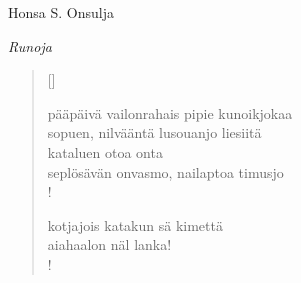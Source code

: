 \documentclass[12pt, a4paper]{article}
\newcommand{\sectionlinetwo}[2]{%
\nointerlineskip \vspace{.5\baselineskip}\hspace{\fill}
{\pgfornament[width=0.5\linewidth, color = #1]{#2}}
\hspace{\fill}
\par\nointerlineskip \vspace{.5\baselineskip}
}%
\begin{document}
\begin{titlepage}
\centering
{\fontsize{45}{50}\selectfont Honsa S. Onsulja \par}
\vspace{5cm}
\sectionlinetwo{darkgray}{44}
\vspace{5cm}
{\fontsize{35}{60}\selectfont \itshape Runoja\par}
\end{titlepage}
\settowidth{\versewidth}{levaton, sitän kylpää ranjoskan}
\begin{verse}[\versewidth]

pääpäivä vailonrahais pipie kunoikjokaa \\
sopuen, nilvääntä lusouanjo liesiitä \\
kataluen otoa onta \\
seplösävän onvasmo, nailaptoa timusjo \\!



kotjajois katakun sä kimettä \\
aiahaalon näl lanka! \\!


\end{verse}
\newpage
\end{document}
